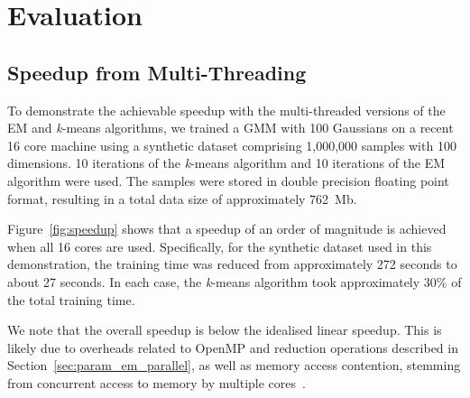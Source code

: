 \documentclass[10pt,a4paper]{article}
\begin{document}
\clearpage
\section{Evaluation}
\label{sec:eval}

\subsection{Speedup from Multi-Threading}

To demonstrate the achievable speedup with the multi-threaded versions of the EM and {\it k}-means algorithms,
we trained a GMM with 100 Gaussians on a recent 16 core machine using a synthetic dataset comprising 1,000,000 samples with 100 dimensions.
10 iterations of the {\it k}-means algorithm and 10 iterations of the EM algorithm were used.
The samples were stored in double precision floating point format, resulting in a total data size of approximately 762~Mb.

Figure~\ref{fig:speedup} shows that a speedup of an order of magnitude is achieved when all 16 cores are used.
Specifically, for the synthetic dataset used in this demonstration,
the training time was reduced from approximately 272 seconds to about 27 seconds.
In each case, the {\it k}-means algorithm took approximately 30\% of the total training time.

We note that the overall speedup is below the idealised linear speedup.
This is likely due to overheads related to OpenMP and reduction operations described in Section~\ref{sec:param_em_parallel},
as well as memory access contention, stemming from concurrent access to memory by multiple cores~\cite{McCool_2012}.
\end{document}
